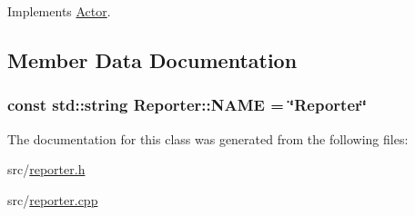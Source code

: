 Implements \hyperlink{classActor_a1595ffb3d753120a9e74eac0bd69adf1}{Actor}.



\subsection{Member Data Documentation}
\subsubsection[{\texorpdfstring{N\+A\+ME}{NAME}}]{\setlength{\rightskip}{0pt plus 5cm}const std\+::string Reporter\+::\+N\+A\+ME = \char`\"{}Reporter\char`\"{}\hspace{0.3cm}{\ttfamily [static]}}\hypertarget{classReporter_a0e02a11312453ea2ad20cbcf32df478d}{}\label{classReporter_a0e02a11312453ea2ad20cbcf32df478d}


The documentation for this class was generated from the following files\+:\begin{DoxyCompactItemize}
\item 
src/\hyperlink{reporter_8h}{reporter.\+h}\item 
src/\hyperlink{reporter_8cpp}{reporter.\+cpp}\end{DoxyCompactItemize}
